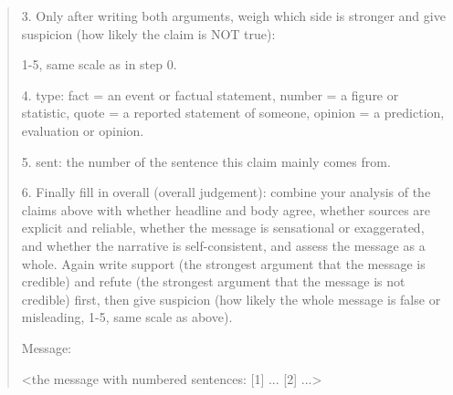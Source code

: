 {\begin{quote}
3. Only after writing both arguments, weigh which side is stronger and give suspicion (how likely the claim is NOT true):\par
\hspace*{3em}1-5, same scale as in step 0.\par
4. type: fact = an event or factual statement, number = a figure or statistic, quote = a reported statement of someone, opinion = a prediction, evaluation or opinion.\par
5. sent: the number of the sentence this claim mainly comes from.\par
6. Finally fill in overall (overall judgement): combine your analysis of the claims above with whether headline and body agree, whether sources are explicit and reliable, whether the message is sensational or exaggerated, and whether the narrative is self-consistent, and assess the message as a whole. Again write support (the strongest argument that the message is credible) and refute (the strongest argument that the message is not credible) first, then give suspicion (how likely the whole message is false or misleading, 1-5, same scale as above).\par
\vspace{3pt}
Message:\par
\textless{}the message with numbered sentences: [1] ... [2] ...\textgreater{}\par
\end{quote}}
